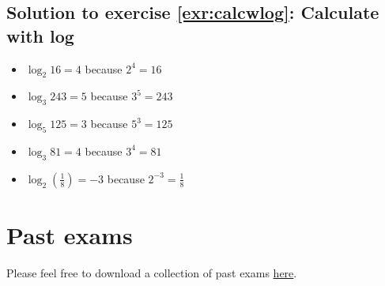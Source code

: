 \documentclass[
  12pt,
  oneside]{book}
\providecommand{\tightlist}{%
  \setlength{\itemsep}{0pt}\setlength{\parskip}{0pt}}
\theoremstyle{definition}
\theoremstyle{definition}
\theoremstyle{definition}
\theoremstyle{definition}
\theoremstyle{remark}
\begin{document}
\subsection*{Solution to exercise \ref{exr:calcwlog}: Calculate with log}\label{sol:calcwlog}

\begin{itemize}
\tightlist
\item
  \(\log_2 16=4\) because \(2^4=16\)
\item
  \(\log_3 243=5\) because \(3^5=243\)
\item
  \(\log_5 125=3\) because \(5^3=125\)
\item
  \(\log_3 81=4\) because \(3^4=81\)
\item
  \(\log_2 \left(\frac{1}{8}\right)=-3\) because \(2^{-3}=\frac{1}{8}\)
\end{itemize}

\section{Past exams}\label{pastexams}

Please feel free to download a collection of past exams \href{https://raw.githubusercontent.com/hubchev/hubchev.github.io/meco/main/pexam_me.pdf}{here}.

  
\end{document}
